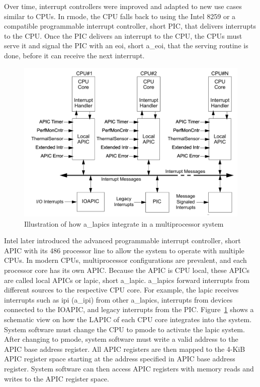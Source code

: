 Over time, interrupt controllers were improved and adapted to new use cases
similar to CPUs. In \gls{rmode}, the CPU falls back to using the Intel 8259 or a
compatible programmable interrupt controller, short PIC, that delivers
interrupts to the CPU. Once the PIC delivers an interrupt to the CPU, the CPUs
must serve it and signal the PIC with an \gls{eoi}, short \acrshort{a_eoi}, that
the serving routine is done, before it can receive the next interrupt. \\

\begin{figure}
    \begin{center}
        \includegraphics[width=.6\textwidth]{images/lapic_placeholder.png}
        \caption{Illustration of how \acrshort{a_lapic}s integrate in a
            multiprocessor system}
        \label{fig:state:technical:lapic}
    \end{center}
\end{figure}

Intel later introduced the advanced programmable interrupt controller, short
APIC with its 486 processor line to allow the system to operate with multiple
CPUs. In modern CPUs, multiprocessor configurations are prevalent, and each
processor core has its own APIC. Because the APIC is CPU local, these APICs are
called local APICs or \gls{lapic}, short \acrshort{a_lapic}. \acrshort{a_lapic}s
forward interrupts from different sources to the respective CPU core. For
example, the \gls{lapic} receives interrupts such as \gls{ipi}
(\acrshort{a_ipi}) from other \acrshort{a_lapic}s, interrupts from devices
connected to the IOAPIC, and legacy interrupts from the PIC.
Figure~\ref{fig:state:technical:lapic} shows a schematic view on how the LAPIC
of each CPU core integrates into the system. System software must change the CPU
to \gls{pmode} to activate the \acrshort{lapic} system. After changing to
\gls{pmode}, system software must write a valid address to the APIC base address
register. All APIC registers are then mapped to the 4-KiB APIC register space
starting at the address specified in APIC base address register. System software
can then access APIC registers with memory reads and writes to the APIC register
space.

